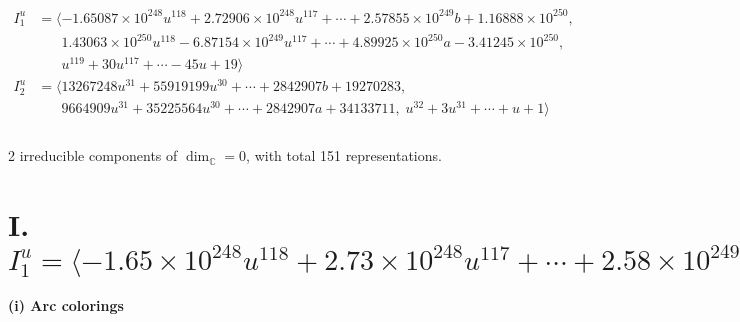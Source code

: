 \documentclass[1p]{elsarticle_modified}
\theoremstyle{definition}
\begin{document}
\begin{align*}
I^u_{1}&=\langle 
-1.65087\times10^{248} u^{118}+2.72906\times10^{248} u^{117}+\cdots+2.57855\times10^{249} b+1.16888\times10^{250},\\
\phantom{I^u_{1}}&\phantom{= \langle  }1.43063\times10^{250} u^{118}-6.87154\times10^{249} u^{117}+\cdots+4.89925\times10^{250} a-3.41245\times10^{250},\\
\phantom{I^u_{1}}&\phantom{= \langle  }u^{119}+30 u^{117}+\cdots-45 u+19\rangle \\
I^u_{2}&=\langle 
13267248 u^{31}+55919199 u^{30}+\cdots+2842907 b+19270283,\\
\phantom{I^u_{2}}&\phantom{= \langle  }9664909 u^{31}+35225564 u^{30}+\cdots+2842907 a+34133711,\;u^{32}+3 u^{31}+\cdots+u+1\rangle \\
\\
\end{align*}
\raggedright * 2 irreducible components of $\dim_{\mathbb{C}}=0$, with total 151 representations.\\
\newpage
\renewcommand{\arraystretch}{1}
\centering \section*{I. $I^u_{1}= \langle -1.65\times10^{248} u^{118}+2.73\times10^{248} u^{117}+\cdots+2.58\times10^{249} b+1.17\times10^{250},\;1.43\times10^{250} u^{118}-6.87\times10^{249} u^{117}+\cdots+4.90\times10^{250} a-3.41\times10^{250},\;u^{119}+30 u^{117}+\cdots-45 u+19 \rangle$}
\flushleft \textbf{(i) Arc colorings}\\
\end{document}
